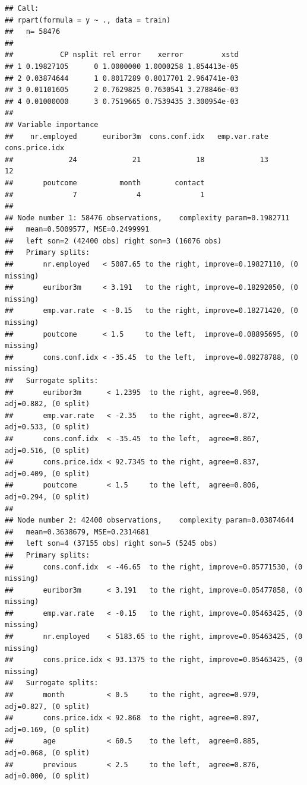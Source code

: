 \documentclass[
]{article}
\begin{document}
\begin{verbatim}
## Call:
## rpart(formula = y ~ ., data = train)
##   n= 58476 
## 
##           CP nsplit rel error    xerror         xstd
## 1 0.19827105      0 1.0000000 1.0000258 1.854413e-05
## 2 0.03874644      1 0.8017289 0.8017701 2.964741e-03
## 3 0.01101605      2 0.7629825 0.7630541 3.278846e-03
## 4 0.01000000      3 0.7519665 0.7539435 3.300954e-03
## 
## Variable importance
##    nr.employed      euribor3m  cons.conf.idx   emp.var.rate cons.price.idx 
##             24             21             18             13             12 
##       poutcome          month        contact 
##              7              4              1 
## 
## Node number 1: 58476 observations,    complexity param=0.1982711
##   mean=0.5009577, MSE=0.2499991 
##   left son=2 (42400 obs) right son=3 (16076 obs)
##   Primary splits:
##       nr.employed   < 5087.65 to the right, improve=0.19827110, (0 missing)
##       euribor3m     < 3.191   to the right, improve=0.18292050, (0 missing)
##       emp.var.rate  < -0.15   to the right, improve=0.18271420, (0 missing)
##       poutcome      < 1.5     to the left,  improve=0.08895695, (0 missing)
##       cons.conf.idx < -35.45  to the left,  improve=0.08278788, (0 missing)
##   Surrogate splits:
##       euribor3m      < 1.2395  to the right, agree=0.968, adj=0.882, (0 split)
##       emp.var.rate   < -2.35   to the right, agree=0.872, adj=0.533, (0 split)
##       cons.conf.idx  < -35.45  to the left,  agree=0.867, adj=0.516, (0 split)
##       cons.price.idx < 92.7345 to the right, agree=0.837, adj=0.409, (0 split)
##       poutcome       < 1.5     to the left,  agree=0.806, adj=0.294, (0 split)
## 
## Node number 2: 42400 observations,    complexity param=0.03874644
##   mean=0.3638679, MSE=0.2314681 
##   left son=4 (37155 obs) right son=5 (5245 obs)
##   Primary splits:
##       cons.conf.idx  < -46.65  to the right, improve=0.05771530, (0 missing)
##       euribor3m      < 3.191   to the right, improve=0.05477858, (0 missing)
##       emp.var.rate   < -0.15   to the right, improve=0.05463425, (0 missing)
##       nr.employed    < 5183.65 to the right, improve=0.05463425, (0 missing)
##       cons.price.idx < 93.1375 to the right, improve=0.05463425, (0 missing)
##   Surrogate splits:
##       month          < 0.5     to the right, agree=0.979, adj=0.827, (0 split)
##       cons.price.idx < 92.868  to the right, agree=0.897, adj=0.169, (0 split)
##       age            < 60.5    to the left,  agree=0.885, adj=0.068, (0 split)
##       previous       < 2.5     to the left,  agree=0.876, adj=0.000, (0 split)

\end{verbatim}
\end{document}
